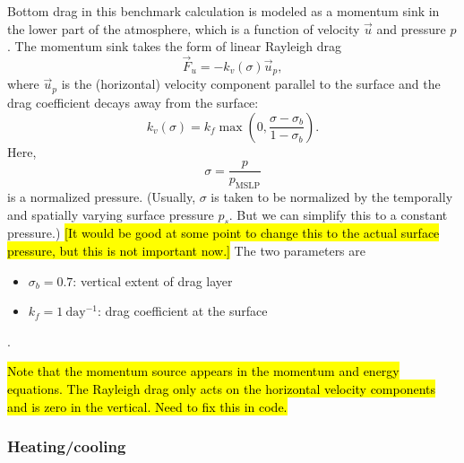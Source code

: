 \documentclass{report}
\begin{document}
Bottom drag in this benchmark calculation is modeled as a momentum sink in the lower part of the atmosphere, which is a function of velocity $\vec{u}$ and pressure $p$. The momentum sink takes the form of linear Rayleigh drag
\begin{equation}
    \vec{F}_u = -k_v(\sigma) \vec{u}_p,
\end{equation}
where $\vec{u}_p$ is the (horizontal) velocity component parallel to the surface and the drag coefficient decays away from the surface:
\begin{equation}
    k_v(\sigma) = k_f \max \left( 0, \frac{\sigma - \sigma_b}{1-\sigma_b} \right).
\end{equation}
Here,
\[
\sigma = \frac{p}{p_{\mathrm{MSLP}}}
\]
is a normalized pressure. (Usually, $\sigma$ is taken to be normalized by the temporally and spatially varying surface pressure $p_s$. But we can simplify this to a constant pressure.) \hl{[It would be good at some point to change this to the actual surface pressure, but this is not important now.]} The two parameters are
\begin{itemize}
    \item $\sigma_b = 0.7$: vertical extent of drag layer
    \item $k_f = 1~\mathrm{day^{-1}}$: drag coefficient at the surface
\end{itemize}.

\hl{Note that the momentum source appears in the momentum and energy equations. The Rayleigh drag only acts on the horizontal velocity components and is zero in the vertical. Need to fix this in code.}

\subsubsection{Heating/cooling}
\end{document}
